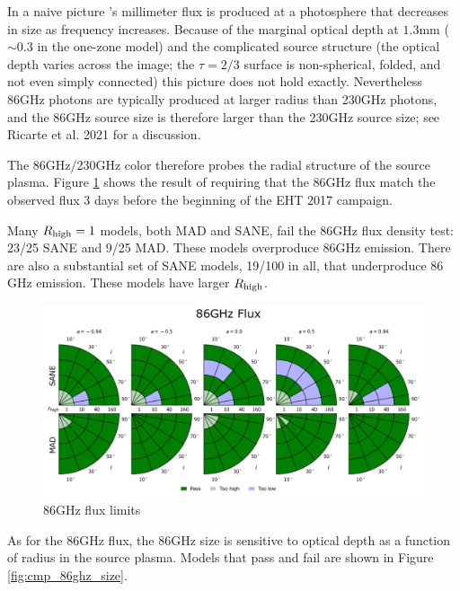 
In a naive picture \sgra's millimeter flux is produced at a photosphere that decreases in size as frequency increases.  Because of the marginal optical depth at $1.3$mm ($\sim 0.3$ in the one-zone model) and the complicated source structure (the optical depth varies across the image; the $\tau = 2/3$ surface is non-spherical, folded, and not even simply connected) this picture does not hold exactly.  Nevertheless 86GHz photons are typically produced at larger radius than 230GHz photons, and the 86GHz source size is therefore larger than the 230GHz source size; see Ricarte et al. 2021 for a discussion.

The 86GHz/230GHz color therefore probes the radial structure of the source plasma.  Figure \ref{fig:cmp_86ghz_flux} shows the result of requiring that the 86GHz flux match the observed flux 3 days before the beginning of the EHT 2017 campaign.

Many $R_\mathrm{high} = 1$ models, both MAD and SANE, fail the $86$GHz flux density test: 23/25 SANE and 9/25 MAD.  These models overproduce $86$GHz emission.
There are also a substantial set of SANE models, 19/100 in all, that underproduce $86$GHz emission.  These models have larger $R_\mathrm{high}$.

\begin{figure}
  \centering
  \includegraphics[width=\columnwidth]{./figures/86GHz_flux_Constraints.png}
  \caption{86GHz flux limits}
  \label{fig:cmp_86ghz_flux}
\end{figure}



As for the $86$GHz flux, the $86$GHz size is sensitive to optical depth as a function of radius in the source plasma. Models that pass and fail are shown in Figure \ref{fig:cmp_86ghz_size}.

